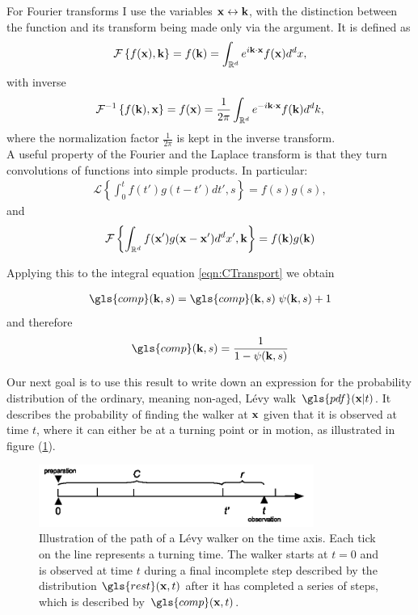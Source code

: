 For Fourier transforms I use the variables $\mathbf{ x } \leftrightarrow \mathbf{ k }$, with the distinction between the function and its transform being made only via the argument. It is defined as 
%
\begin{align}
\mathcal{F} \left\{ f(\mathbf{ x }), \mathbf{ k } \right\} = f(\mathbf{ k }) = \int_{\mathbb{R}^{d}} e^{i\mathbf{ k } \cdot \mathbf{ x }} f(\mathbf{ x }) d^{d}x ,
\end{align}
%
with inverse 
%
\begin{align}
\mathcal{F}^{-1} \left\{ f(\mathbf{ k }), \mathbf{ x } \right\} = f(\mathbf{ x }) = \frac{1}{2 \pi} \int_{\mathbb{R}^{d}} e^{-i\mathbf{ k } \cdot \mathbf{ x }} f(\mathbf{ k }) d^{d}k ,
\end{align}
%
where the normalization factor $\frac{1}{2 \pi}$ is kept in the inverse transform.\\

A useful property of the Fourier and the Laplace transform is that they turn convolutions of functions into simple products. In particular:
%
\begin{align}
\mathcal{L} \left\{ \int_{0}^{t} f(t') g(t-t') dt', s \right\} = f(s) g(s) , \label{eqn:LConvolution}
\end{align}
%
and 
%
\begin{align}
\mathcal{F} \left\{ \int_{\mathbb{R}^{d}} f(\mathbf{ x }') g(\mathbf{ x } - \mathbf{ x }') d^{d}x' , \mathbf{ k } \right\} = f(\mathbf{ k }) g(\mathbf{ k })  \label{eqn:FConvolution}
\end{align}

Applying this to the integral equation \ref{eqn:CTransport} we obtain 

\begin{align}
\gls{comp}(\ve{k},s) =  \gls{comp}(\ve{k},s)  \; \psi(\ve{k},s) + 1
\end{align}
%
and therefore 
%
\begin{align}
\gls{comp}(\ve{k},s) = \frac{1}{1 - \psi(\ve{k},s)} \label{eqn:CFourierLaplace}
\end{align}

Our next goal is to use this result to write down an expression for the probability distribution of the ordinary, meaning non-aged, L\'evy walk $\gls{pdf}(\ve{x}|t)$. It describes the probability of finding the walker at $\mathbf{ x }$ given that it is observed at time $t$, where it can either be at a turning point or in motion, as illustrated in figure (\ref{fig:pdfOrdinary}). 

\begin{figure}
\begin{center}
\includegraphics[width=90mm]{pics/pdfOrdinary.png}
\caption{Illustration of the path of a L\'evy walker on the time axis. Each tick on the line represents a turning time. The walker starts at $t=0$ and is observed at time $t$ during a final incomplete step described by the distribution $\gls{rest}(\ve{x},t)$ after it has completed a series of steps, which is described by $\gls{comp}(\ve{x},t)$. 
\label{fig:pdfOrdinary}}
\end{center}
\end{figure}

